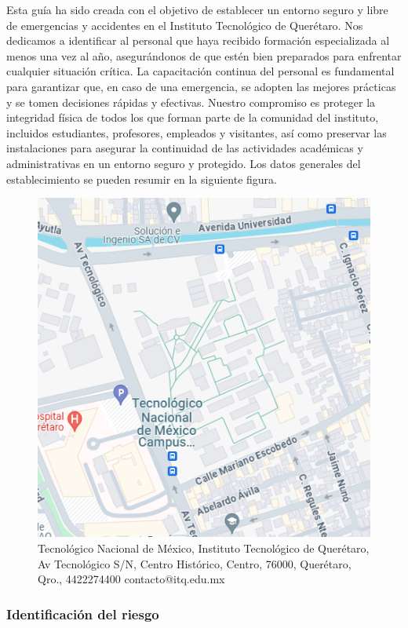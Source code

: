     Esta guía ha sido creada con el objetivo de establecer un entorno seguro y libre de emergencias y accidentes en el Instituto Tecnológico de Querétaro. Nos dedicamos a identificar al personal que haya recibido formación especializada al menos una vez al año, asegurándonos de que estén bien preparados para enfrentar cualquier situación crítica. La capacitación continua del personal es fundamental para garantizar que, en caso de una emergencia, se adopten las mejores prácticas y se tomen decisiones rápidas y efectivas. Nuestro compromiso es proteger la integridad física de todos los que forman parte de la comunidad del instituto, incluidos estudiantes, profesores, empleados y visitantes, así como preservar las instalaciones para asegurar la continuidad de las actividades académicas y administrativas en un entorno seguro y protegido.
    Los datos generales del establecimiento se pueden resumir en la siguiente figura.
    \begin{figure}[H]
        \centering
        \includegraphics[scale=0.4]{35/Img/MAPAITQ.png}
        \caption{Tecnológico Nacional de México, Instituto Tecnológico de Querétaro, Av Tecnológico S/N, Centro Histórico, Centro, 76000, Querétaro, Qro., 4422274400 contacto@itq.edu.mx}
        \label{fig:mapa-itq}
    \end{figure}
    
    \subsubsection{Identificación del riesgo}
    
